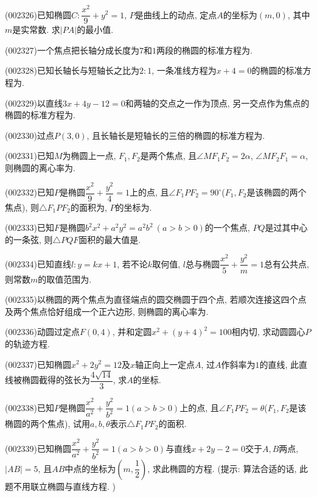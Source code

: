 \item (002326)已知椭圆$C: \dfrac{x^2}{9}+y^2=1$, $P$是曲线上的动点, 定点$A$的坐标为$(m,0)$, 其中$m$是实常数.
求$|PA|$的最小值.
\item (002327)一个焦点把长轴分成长度为$7$和$1$两段的椭圆的标准方程为.
\item (002328)已知长轴长与短轴长之比为$2:1$, 一条准线方程为$x+4=0$的椭圆的标准方程为.
\item (002329)以直线$3x+4y-12=0$和两轴的交点之一作为顶点, 另一交点作为焦点的椭圆的标准方程为.
\item (002330)过点$P(3,0)$, 且长轴长是短轴长的三倍的椭圆的标准方程为.
\item (002331)已知$M$为椭圆上一点, $F_1,F_2$是两个焦点, 且$\angle MF_1F_2=2\alpha$, $\angle MF_2F_1=\alpha$, 则椭圆的离心率为.
\item (002332)已知$P$是椭圆$\dfrac{x^2}{9}+\dfrac{y^2}{4}=1$上的点, 且$\angle F_1PF_2=90^\circ$($F_1,F_2$是该椭圆的两个焦点), 则$\triangle F_1PF_2$的面积为, $P$的坐标为.
\item (002333)已知$F$是椭圆$b^2x^2+a^2y^2=a^2b^2 \ (a>b>0)$的一个焦点, $PQ$是过其中心的一条弦, 则$\triangle PQF$面积的最大值是.
\item (002334)已知直线$l:y=kx+1$, 若不论$k$取何值, $l$总与椭圆$\dfrac{x^2}{5}+\dfrac{y^2}{m}=1$总有公共点,
则常数$m$的取值范围为.
\item (002335)以椭圆的两个焦点为直径端点的圆交椭圆于四个点, 若顺次连接这四个点及两个焦点恰好组成一个正六边形, 则椭圆的离心率为.
\item (002336)动圆过定点$F(0,4)$, 并和定圆$x^2+(y+4)^2=100$相内切, 求动圆圆心$P$的轨迹方程.
\item (002337)已知椭圆$x^2+2y^2=12$及$x$轴正向上一定点$A$, 过$A$作斜率为$1$的直线, 此直线被椭圆截得的弦长为$\dfrac{4\sqrt{14}}{3}$, 求$A$的坐标.
\item (002338)已知$P$是椭圆$\dfrac{x^2}{a^2}+\dfrac{y^2}{b^2}=1(a>b>0)$上的点, 且$\angle F_1PF_2=\theta$($F_1,F_2$是该椭圆的两个焦点), 试用$a,b,\theta$表示$\triangle F_1PF_2$的面积.
\item (002339)已知椭圆$\dfrac{x^2}{a^2}+\dfrac{y^2}{b^2}=1(a>b>0)$与直线$x+2y-2=0$交于$A,B$两点, $|AB|=5$,
且$AB$中点的坐标为$(m,\dfrac{1}{2})$, 求此椭圆的方程. (提示: 算法合适的话, 此题不用联立椭圆与直线方程. )
